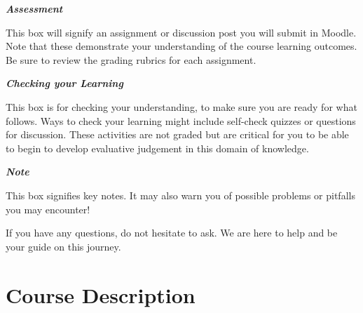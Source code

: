 \documentclass[
  letterpaper,
  DIV=11,
  numbers=noendperiod]{scrreprt}
\begin{document}
\begin{tcolorbox}[enhanced jigsaw, breakable, colback=white, bottomrule=.15mm, leftrule=.75mm, colframe=quarto-callout-note-color-frame, rightrule=.15mm, arc=.35mm, toprule=.15mm, left=2mm, opacityback=0]

\textbf{\emph{Assessment}}

This box will signify an assignment or discussion post you will submit
in Moodle. Note that these demonstrate your understanding of the course
learning outcomes. Be sure to review the grading rubrics for each
assignment.

\end{tcolorbox}

\begin{tcolorbox}[enhanced jigsaw, breakable, colback=white, bottomrule=.15mm, leftrule=.75mm, colframe=quarto-callout-warning-color-frame, rightrule=.15mm, arc=.35mm, toprule=.15mm, left=2mm, opacityback=0]

\textbf{\emph{Checking your Learning}}

This box is for checking your understanding, to make sure you are ready
for what follows. Ways to check your learning might include self-check
quizzes or questions for discussion. These activities are not graded but
are critical for you to be able to begin to develop evaluative judgement
in this domain of knowledge.

\end{tcolorbox}

\begin{tcolorbox}[enhanced jigsaw, breakable, colback=white, bottomrule=.15mm, leftrule=.75mm, colframe=quarto-callout-important-color-frame, rightrule=.15mm, arc=.35mm, toprule=.15mm, left=2mm, opacityback=0]

\textbf{\emph{Note}}

This box signifies key notes. It may also warn you of possible problems
or pitfalls you may encounter!

\end{tcolorbox}

If you have any questions, do not hesitate to ask. We are here to help
and be your guide on this journey.


\chapter{Course Description}\label{course-description}
\end{document}
